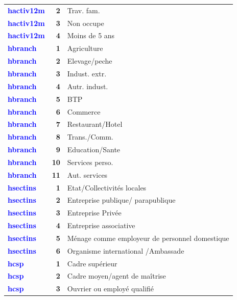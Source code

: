 \documentclass[
]{article}
\begin{document}
\begin{longtable}[t]{>{}l>{}r>{\raggedright\arraybackslash}p{8cm}}
\textcolor{blue}{\textbf{hactiv12m}} & \textbf{2} & Trav. fam.\\
\textcolor{blue}{\textbf{hactiv12m}} & \textbf{3} & Non occupe\\
\addlinespace
\textcolor{blue}{\textbf{hactiv12m}} & \textbf{4} & Moins de 5 ans\\
\textcolor{blue}{\textbf{hbranch}} & \textbf{1} & Agriculture\\
\textcolor{blue}{\textbf{hbranch}} & \textbf{2} & Elevage/peche\\
\textcolor{blue}{\textbf{hbranch}} & \textbf{3} & Indust. extr.\\
\textcolor{blue}{\textbf{hbranch}} & \textbf{4} & Autr. indust.\\
\addlinespace
\textcolor{blue}{\textbf{hbranch}} & \textbf{5} & BTP\\
\textcolor{blue}{\textbf{hbranch}} & \textbf{6} & Commerce\\
\textcolor{blue}{\textbf{hbranch}} & \textbf{7} & Restaurant/Hotel\\
\textcolor{blue}{\textbf{hbranch}} & \textbf{8} & Trans./Comm.\\
\textcolor{blue}{\textbf{hbranch}} & \textbf{9} & Education/Sante\\
\addlinespace
\textcolor{blue}{\textbf{hbranch}} & \textbf{10} & Services perso.\\
\textcolor{blue}{\textbf{hbranch}} & \textbf{11} & Aut. services\\
\textcolor{blue}{\textbf{hsectins}} & \textbf{1} & Etat/Collectivités locales\\
\textcolor{blue}{\textbf{hsectins}} & \textbf{2} & Entreprise publique/ parapublique\\
\textcolor{blue}{\textbf{hsectins}} & \textbf{3} & Entreprise Privée\\
\addlinespace
\textcolor{blue}{\textbf{hsectins}} & \textbf{4} & Entreprise associative\\
\textcolor{blue}{\textbf{hsectins}} & \textbf{5} & Ménage comme employeur de personnel domestique\\
\textcolor{blue}{\textbf{hsectins}} & \textbf{6} & Organisme international /Ambassade\\
\textcolor{blue}{\textbf{hcsp}} & \textbf{1} & Cadre supérieur\\
\textcolor{blue}{\textbf{hcsp}} & \textbf{2} & Cadre moyen/agent de maîtrise\\
\addlinespace
\textcolor{blue}{\textbf{hcsp}} & \textbf{3} & Ouvrier ou employé qualifié\\

\end{longtable}
\end{document}
